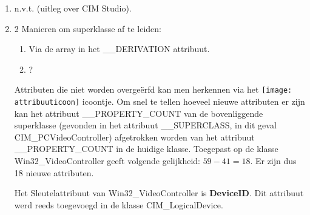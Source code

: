 \documentclass{report}
\begin{document}
	\begin{enumerate}
		\item n.v.t. (uitleg over CIM Studio).
		\item 2 Manieren om superklasse af te leiden:
			\begin{enumerate}
				\item Via de array in het \_\_DERIVATION attribuut.
				\item ?
			\end{enumerate}
			Attributen die niet worden overgeërfd kan men herkennen via het \texttt{[image: attribuuticoon]} icoontje. Om snel te tellen hoeveel nieuwe attributen er zijn kan het attribuut \_\_PROPERTY\_COUNT van de bovenliggende superklasse (gevonden in het attribuut \_\_SUPERCLASS, in dit geval CIM\_PCVideoController) afgetrokken worden van het attribuut \_\_PROPERTY\_COUNT in de huidige klasse. Toegepast op de klasse Win32\_VideoController geeft volgende gelijkheid: $59 - 41 = 18$. Er zijn dus 18 nieuwe attributen.
			
			Het Sleutelattribuut van Win32\_VideoController is \textbf{DeviceID}. Dit attribuut werd reeds toegevoegd in de klasse CIM\_LogicalDevice.
			

\end{enumerate}
\end{document}
